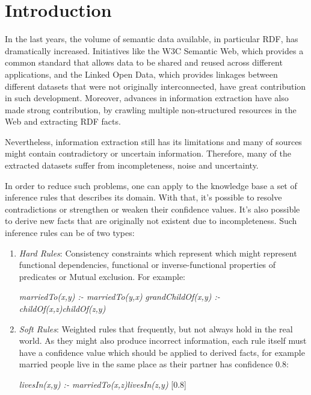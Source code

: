 \chapter{Introduction}
\label{ch:intro}

In the last years, the volume of semantic data available, in particular RDF, has dramatically increased. Initiatives like the W3C Semantic Web, which provides a common standard that allows data to be shared and reused across different applications, and the Linked Open Data, which provides linkages between different datasets that were not originally interconnected, have great contribution in such development. Moreover, advances in information extraction have also made strong contribution, by crawling multiple non-structured resources in the Web and extracting RDF facts.

Nevertheless, information extraction still has its limitations and many of sources might contain contradictory or uncertain information. Therefore, many of the extracted datasets suffer from incompleteness, noise and uncertainty.

In order to reduce such problems, one can apply to the knowledge base a set of inference rules that describes its domain. With that, it's possible to resolve contradictions or strengthen or weaken their confidence values. It's also possible to derive new facts that are originally not existent due to incompleteness. Such inference rules can be of two types:

\begin{enumerate}

 \item \emph{Hard Rules}: Consistency constraints which represent which might represent functional dependencies, functional or inverse-functional properties of predicates or Mutual exclusion. For example:
    \begin{center}
      \emph{marriedTo(x,y) :- marriedTo(y,x)}
      \emph{grandChildOf(x,y) :- childOf(x,z)childOf(z,y)}
    \end{center}

 \item \emph{Soft Rules}: Weighted rules that frequently, but not always hold in the real world. As they might also produce incorrect information, each rule itself must have a confidence value which should be applied to derived facts, for example married people live in the same place as their partner has confidence 0.8:
    \begin{center}
      \emph{livesIn(x,y) :- marriedTo(x,z)livesIn(z,y)} [0.8]
    \end{center}
\end{enumerate}

